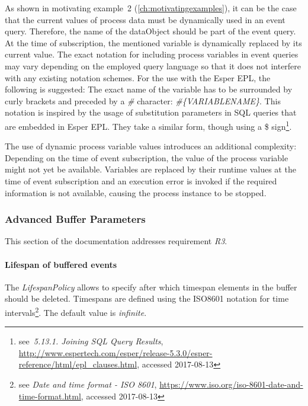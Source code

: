
As shown in motivating example~2 (\autoref{ch:motivatingexamples}), it can be the case that the current values of process data must be dynamically used in an event query.
Therefore, the name of the dataObject should be part of the event query. At the time of subscription, the mentioned variable is dynamically replaced by its current value.
The exact notation for including process variables in event queries may vary depending on the employed query language so that it does not interfere with any existing notation schemes.
For the use with the Esper EPL, the following is suggested: The exact name of the variable has to be surrounded by curly brackets and preceded by a \textit{\#} character: \textit{\#\{VARIABLENAME\}}.
This notation is inspired by the usage of substitution parameters in SQL queries that are embedded in Esper EPL. They take a similar form, though using a \$ sign\footnote{see~\textit{5.13.1. Joining SQL Query Results}, \url{http://www.espertech.com/esper/release-5.3.0/esper-reference/html/epl_clauses.html}, accessed 2017-08-13}.

The use of dynamic process variable values introduces an additional complexity: Depending on the time of event subscription, the value of the process variable might not yet be available.
Variables are replaced by their runtime values at the time of event subscription and an execution error is invoked if the required information is not available, causing the process instance to be stopped.

\subsubsection{Advanced Buffer Parameters}\label{ch:bpmnx:bufferpolicies}
This section of the documentation addresses requirement \textit{R3}.

\paragraph{Lifespan of buffered events\newline}

The \textit{LifespanPolicy} allows to specify after which timespan elements in the buffer should be deleted. Timespans are defined using the ISO8601 notation for time intervals\footnote{see \textit{Date and time format - ISO 8601}, \url{https://www.iso.org/iso-8601-date-and-time-format.html}, accessed 2017-08-13}. 
The default value is \textit{infinite}.

